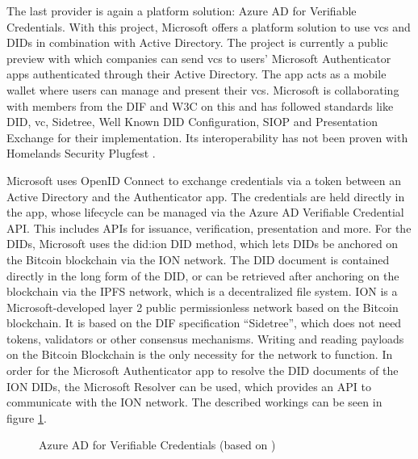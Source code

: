     The last provider is again a platform solution: Azure AD for Verifiable Credentials. With this project, Microsoft offers a platform solution to use \acp{vc} and \acp{DID} in combination with Active Directory. The project is currently a public preview with which companies can send \acp{vc} to users' Microsoft Authenticator apps authenticated through their Active Directory. The app acts as a mobile wallet where users can manage and present their \acp{vc}. Microsoft is collaborating with members from the DIF and W3C on this and has followed standards like \ac{DID}, \ac{vc}, Sidetree, Well Known DID Configuration, SIOP and Presentation Exchange for their implementation. Its interoperability has not been proven with Homelands Security Plugfest \cite{homeland_security_interoperability_2021}. \cite{neira_introduction_2021, simons_announcing_2021, microsoft_identitatsnachweis-losungen_2021}
    
    Microsoft uses OpenID Connect to exchange credentials via a token between an Active Directory and the Authenticator app. The credentials are held directly in the app, whose lifecycle can be managed via the Azure AD Verifiable Credential API. This includes APIs for issuance, verification, presentation and more. For the \acp{DID}, Microsoft uses the did:ion \ac{DID} method, which lets \acp{DID} be anchored on the Bitcoin blockchain via the ION network. The \ac{DID} document is contained directly in the long form of the \ac{DID}, or can be retrieved after anchoring on the blockchain via the IPFS network, which is a decentralized file system. ION is a Microsoft-developed layer 2 public permissionless network based on the Bitcoin blockchain. It is based on the DIF specification “Sidetree”, which does not need tokens, validators or other consensus mechanisms. Writing and reading payloads on the Bitcoin Blockchain is the only necessity for the network to function. In order for the Microsoft Authenticator app to resolve the \ac{DID} documents of the ION \acp{DID}, the Microsoft Resolver can be used, which provides an API to communicate with the ION network. The described workings can be seen in figure \ref{figure: azure ad}. \cite{neira_introduction_2021}
    
    \begin{figure}[ht]
	    \centering    	   
	    \makebox[\textwidth]{}
        \caption{Azure AD for Verifiable Credentials (based on \cite{neira_introduction_2021})}
        \label{figure: azure ad}
    \end{figure}
    
